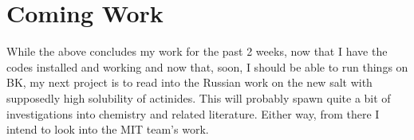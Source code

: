 \documentclass[12pt]{article}
\begin{document}
\section{Coming Work}
While the above concludes my work for the past 2 weeks, now that I have the codes installed
and working and now that, soon, I should be able to run things on BK, my next project
is to read into the Russian work on the new salt with supposedly high solubility of
actinides. This will probably spawn quite a bit of investigations into chemistry and
related literature. Either way, from there I intend to look into the MIT team's work.
\end{document}
